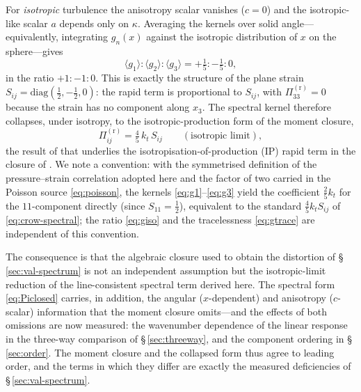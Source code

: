 \documentclass[lineno]{JFM-FLM_Au}
\begin{document}
For \emph{isotropic} turbulence the anisotropy scalar vanishes ($c=0$) and the
isotropic-like scalar $a$ depends only on $\kappa$. Averaging the kernels over
solid angle---equivalently, integrating $g_n(x)$ against the isotropic
distribution of $x$ on the sphere---gives
\begin{equation}
  \langle g_1\rangle : \langle g_2\rangle : \langle g_3\rangle
  = +\tfrac15 : -\tfrac15 : 0,
  \label{eq:giso}
\end{equation}
in the ratio $+1:-1:0$. This is exactly the structure of the plane strain
$S_{ij}=\mathrm{diag}(\tfrac12,-\tfrac12,0)$: the rapid term is proportional to
$S_{ij}$, with $\Pi^{(\mathrm r)}_{33}=0$ because the strain has no component
along $x_3$. The spectral kernel therefore collapses, under isotropy, to the
isotropic-production form of the moment closure,
\begin{equation}
  \Pi^{(\mathrm r)}_{ij}
  = \tfrac{4}{5}\,k_t\,S_{ij}
  \qquad(\text{isotropic limit}),
  \label{eq:crow-spectral}
\end{equation}
the result of \citet{Crow1968} that underlies the isotropisation-of-production
(IP) rapid term in the closure of \citet{LaunderReeceRodi1975}. We note a
convention: with the symmetrised definition of the pressure--strain correlation
adopted here and the factor of two carried in the Poisson source
\eqref{eq:poisson}, the kernels \eqref{eq:g1}--\eqref{eq:g3} yield the
coefficient $\tfrac25 k_t$ for the $11$-component directly (since $S_{11}=\tfrac12$),
equivalent to the standard $\tfrac45 k_t S_{ij}$ of \eqref{eq:crow-spectral}; the ratio
\eqref{eq:giso} and the tracelessness \eqref{eq:gtrace} are independent of this
convention.

The consequence is that the algebraic closure used to obtain the distortion of
\S\,\ref{sec:val-spectrum} is not an independent assumption but the
isotropic-limit reduction of the line-consistent spectral term derived here.
The spectral form \eqref{eq:Piclosed} carries, in addition, the angular
($x$-dependent) and anisotropy ($c$-scalar) information that the moment closure
omits---and the effects of both omissions are now measured: the wavenumber dependence
of the linear response in the three-way comparison of
\S\,\ref{sec:threeway}, and the component ordering in
\S\,\ref{sec:order}. The moment closure and the collapsed form thus
agree to leading order, and the terms in which they differ are exactly
the measured deficiencies of \S\,\ref{sec:val-spectrum}.
\end{document}
